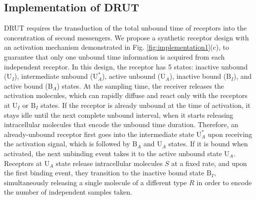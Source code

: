 \documentclass[twocolumn]{IEEEtran}
\newcommand{\B}{\mathrm{B}}
\newcommand{\U}{\mathrm{U}}
\begin{document}

\subsection{Implementation of DRUT}
DRUT requires the transduction of the total unbound time of receptors into the concentration of second messengers. We propose a synthetic receptor design with an activation mechanism demonstrated in Fig. \ref{fig:implementation1}(c), to guarantee that only one unbound time information is acquired from each independent receptor. In this design, the receptor has 5 states: inactive unbound ($\U_I$), intermediate unbound ($\U_A^\ast$), active unbound ($\U_A$), inactive bound ($\B_I$), and active bound ($\B_A$) states. At the sampling time, the receiver releases the activation molecules, which can rapidly diffuse and react only with the receptors at $\U_I$ or $\B_I$ states. If the receptor is already unbound at the time of activation, it stays idle until the next complete unbound interval, when it starts releasing intracellular molecules that encode the unbound time duration. Therefore, an already-unbound receptor first goes into the intermediate state $\U_A^\ast$ upon receiving the activation signal, which is followed by $\B_A$ and $\U_A$ states. If it is bound when activated, the next unbinding event takes it to the active unbound state $\U_A$. Receptors at $\U_A$ state release intracellular molecules $S$ at a fixed rate, and upon the first binding event, they transition to the inactive bound state $\B_I$, simultaneously releasing a single molecule of a different type $R$ in order to encode the number of independent samples taken. 
\end{document}
